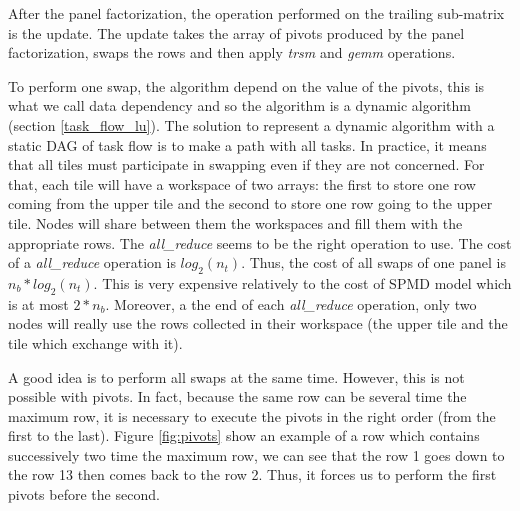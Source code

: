 After the panel factorization, the operation performed on the trailing sub-matrix is the update. The update takes the array of pivots produced by the panel factorization, swaps the rows and then apply \textit{trsm} and \textit{gemm} operations.

To perform one swap, the algorithm depend on the value of the pivots, this is what we call data dependency and so the algorithm is a dynamic algorithm (section \ref{task_flow_lu}). The solution to represent a dynamic algorithm with a static DAG of task flow is to make a path with all tasks. In practice, it means that all tiles must participate in swapping even if they are not concerned.
For that, each tile will have a workspace of two arrays: the first to store one row coming from the upper tile and the second to store one row going to the upper tile. Nodes will share between them the workspaces and fill them with the appropriate rows.
The \textit{all\_reduce} seems to be the right operation to use. The cost of a \textit{all\_reduce} operation is $log_2(n_t)$. Thus, the cost of all swaps of one panel is $n_b*log_2(n_t)$. This is very expensive relatively to the cost of SPMD model which is at most $2*n_b$.
Moreover, a the end of each \textit{all\_reduce} operation, only two nodes will really use the rows collected in their workspace (the upper tile and the tile which exchange with it).

A good idea is to perform all swaps at the same time. However, this is not possible with pivots. In fact, because the same row can be several time the maximum row, it is necessary to execute the pivots in the right order (from the first to the last). Figure \ref{fig:pivots} show an example of a row which contains successively two time the maximum row, we can see that the row 1 goes down to the row 13 then comes back to the row 2. Thus, it forces us to perform the first pivots before the second.

